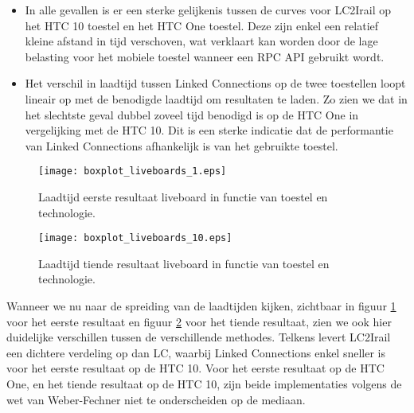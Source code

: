\begin{itemize}
	\item In alle gevallen is er een sterke gelijkenis tussen de curves voor LC2Irail op het HTC 10 toestel en het HTC One toestel. Deze zijn enkel een relatief kleine afstand in tijd verschoven, wat verklaart kan worden door de lage belasting voor het mobiele toestel wanneer een RPC API gebruikt wordt.

	\item Het verschil in laadtijd tussen Linked Connections op de twee toestellen loopt lineair op met de benodigde laadtijd om resultaten te laden. Zo zien we dat in het slechtste geval dubbel zoveel tijd benodigd is op de HTC One in vergelijking met de HTC 10. Dit is een sterke indicatie dat de performantie van Linked Connections afhankelijk is van het gebruikte toestel.
\end{itemize}

\begin{figure}[h]
	\centering
	\texttt{[image: boxplot\_liveboards\_1.eps]}
	\caption[Laadtijd eerste resultaat liveboard in functie van toestel en technologie]{Laadtijd eerste resultaat liveboard in functie van toestel en technologie.}
	\label{fig:liveboardsBoxplot1}
\end{figure}

\begin{figure}[h]
	\centering
	\texttt{[image: boxplot\_liveboards\_10.eps]}
	\caption[Laadtijd tiende resultaat liveboard in functie van toestel en technologie]{Laadtijd tiende resultaat liveboard in functie van toestel en technologie.}
	\label{fig:liveboardsBoxplot10}
\end{figure}

Wanneer we nu naar de spreiding van de laadtijden kijken, zichtbaar in figuur \ref{fig:liveboardsBoxplot1} voor het eerste resultaat en figuur \ref{fig:liveboardsBoxplot10} voor het tiende resultaat, zien we ook hier duidelijke verschillen tussen de verschillende methodes. Telkens levert LC2Irail een dichtere verdeling op dan LC, waarbij Linked Connections enkel sneller is voor het eerste resultaat op de HTC 10. Voor het eerste resultaat op de HTC One, en het tiende resultaat op de HTC 10, zijn beide implementaties volgens de wet van Weber-Fechner niet te onderscheiden op de mediaan.

